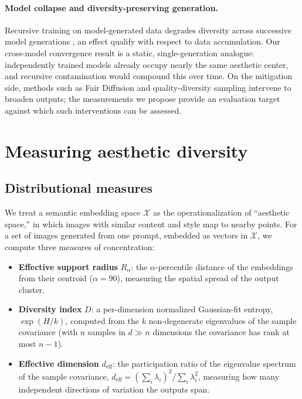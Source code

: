 \documentclass[11pt]{article}
\begin{document}
\paragraph{Model collapse and diversity-preserving generation.} Recursive training on model-generated data degrades diversity across successive model generations \citep{Shumailov2024, Alemohammad2023, Shumailov2023}, an effect \citet{Schaeffer2025} qualify with respect to data accumulation. Our cross-model convergence result is a static, single-generation analogue: independently trained models already occupy nearly the same aesthetic center, and recursive contamination would compound this over time. On the mitigation side, methods such as Fair Diffusion \citep{Friedrich2023} and quality-diversity sampling \citep{Chang2024} intervene to broaden outputs; the measurements we propose provide an evaluation target against which such interventions can be assessed.

\section{Measuring aesthetic diversity}\label{sec:metrics}

\subsection{Distributional measures}

We treat a semantic embedding space $\mathcal{X}$ as the operationalization of ``aesthetic space,'' in which images with similar content and style map to nearby points. For a set of images generated from one prompt, embedded as vectors in $\mathcal{X}$, we compute three measures of concentration:

\begin{itemize}
 \item \textbf{Effective support radius} $R_\alpha$: the $\alpha$-percentile distance of the embeddings from their centroid ($\alpha = 90$), measuring the spatial spread of the output cluster.
 \item \textbf{Diversity index} $D$: a per-dimension normalized Gaussian-fit entropy, $\exp(H/k)$, computed from the $k$ non-degenerate eigenvalues of the sample covariance (with $n$ samples in $d \gg n$ dimensions the covariance has rank at most $n-1$).
 \item \textbf{Effective dimension} $d_{\mathrm{eff}}$: the participation ratio of the eigenvalue spectrum of the sample covariance, $d_{\mathrm{eff}} = (\sum_i \lambda_i)^2 / \sum_i \lambda_i^2$, measuring how many independent directions of variation the outputs span.
\end{itemize}
\end{document}
